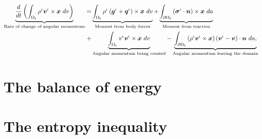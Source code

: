 \begin{equation}
\begin{split}
\underbrace{\frac{d}{dt}\left(\int_{\Omega_{t}} \rho^{\iota}
  \mbox{\boldmath$ v$}^{\iota} \times \mbox{\boldmath$ x$}\ dv\right)}_{\text{Rate of change of angular  momentum}}  = 
& \underbrace{\int_{\Omega_{t}} \rho^{\iota} \left(\mbox{\boldmath$ g$}^{\iota} +
  \mbox{\boldmath$ q$}^{\iota}\right) \times \mbox{\boldmath$ x$}\ dv}_{\text{Moment from body forces}} 
+ \underbrace{\int_{\partial \Omega_{t}}
  \left(\mbox{\boldmath$\sigma$}^{\iota}\cdot\mbox{\boldmath$ n$}\right) \times \mbox{\boldmath$ x$}\ da}_{\text{Moment from traction}}\\ 
+ & \underbrace{\int_{\Omega_{t}} \pi^{\iota}\mbox{\boldmath$ v$}^{\iota} \times
  \mbox{\boldmath$ x$}\ dv}_{\text{Angular momentum being created}} 
- \underbrace{\int_{\partial \Omega_{t}} \left(\rho^{\iota}
  \mbox{\boldmath$ v$}^{\iota}  \times \mbox{\boldmath$ x$}\right) \left(\mbox{\boldmath$ v$}^{\iota} -
\mbox{\boldmath$ v$}\right) \cdot \mbox{\boldmath$ n$}\ da,}_{\text{Angular momentum leaving the domain}} 
\end{split}
\label{globalbalanceofangularmomentum}
\end{equation}

\section{The balance of energy}

\section{The entropy inequality}

%

